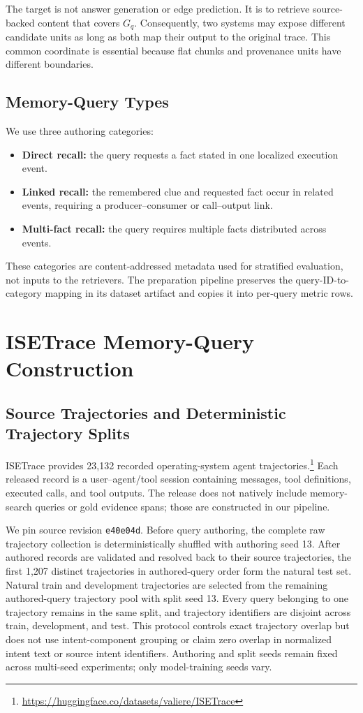 \documentclass[sigconf,anonymous,review]{acmart}
\begin{document}
The target is not answer generation or edge prediction. It is to retrieve source-backed content that covers $G_q$. Consequently, two systems may expose different candidate units as long as both map their output to the original trace. This common coordinate is essential because flat chunks and provenance units have different boundaries.

\subsection{Memory-Query Types}

We use three authoring categories:
\begin{itemize}
    \item \textbf{Direct recall:} the query requests a fact stated in one localized execution event.
    \item \textbf{Linked recall:} the remembered clue and requested fact occur in related events, requiring a producer--consumer or call--output link.
    \item \textbf{Multi-fact recall:} the query requires multiple facts distributed across events.
\end{itemize}
These categories are content-addressed metadata used for stratified evaluation, not inputs to the retrievers. The preparation pipeline preserves the query-ID-to-category mapping in its dataset artifact and copies it into per-query metric rows.

\section{ISETrace Memory-Query Construction}
\label{sec:data}

\subsection{Source Trajectories and Deterministic Trajectory Splits}

ISETrace provides 23,132 recorded operating-system agent trajectories.\footnote{\url{https://huggingface.co/datasets/valiere/ISETrace}} Each released record is a user--agent/tool session containing messages, tool definitions, executed calls, and tool outputs. The release does not natively include memory-search queries or gold evidence spans; those are constructed in our pipeline.

We pin source revision \texttt{e40e04d}. Before query authoring, the complete raw trajectory collection is deterministically shuffled with authoring seed 13. After authored records are validated and resolved back to their source trajectories, the first 1,207 distinct trajectories in authored-query order form the natural test set. Natural train and development trajectories are selected from the remaining authored-query trajectory pool with split seed 13. Every query belonging to one trajectory remains in the same split, and trajectory identifiers are disjoint across train, development, and test. This protocol controls exact trajectory overlap but does not use intent-component grouping or claim zero overlap in normalized intent text or source intent identifiers. Authoring and split seeds remain fixed across multi-seed experiments; only model-training seeds vary.
\end{document}
